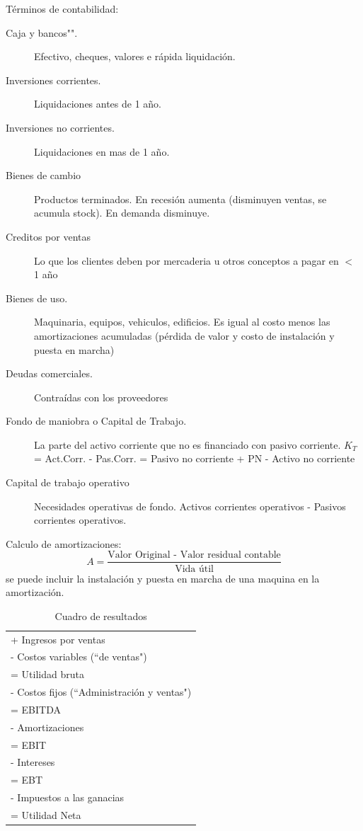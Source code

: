 \documentclass[twocolumn,10pt]{article}
\begin{document}
Términos de contabilidad:
\begin{description}
	\item[Caja y bancos"".] Efectivo, cheques, valores e rápida liquidación.
	\item[Inversiones corrientes.] Liquidaciones antes de 1 año.
	\item[Inversiones no corrientes.] Liquidaciones en mas de 1 año.
	\item[Bienes de cambio] Productos terminados. En recesión aumenta (disminuyen ventas, se acumula stock). En demanda disminuye.
	\item[Creditos por ventas] Lo que los clientes deben por mercaderia u otros conceptos a pagar en $<$ 1 año
	\item[Bienes de uso.] Maquinaria, equipos, vehiculos, edificios. Es igual al costo menos las amortizaciones acumuladas (pérdida de valor y costo de instalación y puesta en marcha)
	\item[Deudas comerciales.] Contraídas con los proveedores
	\item[Fondo de maniobra o Capital de Trabajo.] La parte del activo corriente que no es financiado con pasivo corriente. $K_T$ = Act.Corr. - Pas.Corr. = Pasivo no corriente + PN - Activo no corriente
	\item[Capital de trabajo operativo]  Necesidades operativas de fondo. Activos corrientes operativos - Pasivos corrientes operativos.
\end{description}

Calculo de amortizaciones:
\[
A = \frac{\text{Valor Original - Valor residual contable}}{\text{Vida útil}}
\]
se puede incluir la instalación y puesta en marcha de una maquina en la amortización.


\begin{table}[h]
	\centering
	\begin{tabular}{|l|} \hline
		+ Ingresos por ventas \\
		- Costos variables (``de ventas") \\ \hline
		= Utilidad bruta \\
		- Costos fijos (``Administración y ventas") \\ \hline
		= EBITDA \\
		- Amortizaciones \\ \hline
		= EBIT \\
		- Intereses \\ \hline
		= EBT \\
		- Impuestos a las ganacias
		\\ \hline
		= Utilidad Neta\\ \hline
	\end{tabular}
\caption{Cuadro de resultados}
\end{table}
\end{document}
